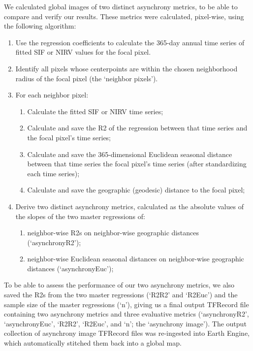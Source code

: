\documentclass[12pt]{article}
\begin{document}
We calculated global images of two distinct asynchrony metrics, to be
able to compare and verify our results. These metrics were calculated,
pixel-wise, using the following algorithm:
\begin{enumerate}
    \item Use the regression coefficients to calculate the 365-day annual time series of fitted SIF or NIRV values for the focal pixel.
    \item Identify all pixels whose centerpoints are within the chosen neighborhood radius of the focal pixel (the ‘neighbor pixels’).
    \item For each neighbor pixel:
    \begin{enumerate}
        \item Calculate the fitted SIF or NIRV time series;
        \item Calculate and save the R2 of the regression between that time series and the focal pixel’s time series;
        \item Calculate and save the 365-dimensional Euclidean seasonal distance between that time series the focal pixel’s time series (after standardizing each time series);
        \item Calculate and save the geographic (geodesic) distance to the focal pixel;
    \end{enumerate}
    \item Derive two distinct asynchrony metrics, calculated as the absolute values of the slopes of the two master regressions of:
        \begin{enumerate}
            \item neighbor-wise R2s on neighbor-wise geographic distances (‘asynchronyR2’);
            \item neighbor-wise Euclidean seasonal distances on neighbor-wise geographic distances (‘asynchronyEuc’);
        \end{enumerate}
\end{enumerate}

To be able to assess the performance of our two asynchrony metrics, we
also saved the R2s from the two master regressions (‘R2R2’ and ‘R2Euc’)
and the sample size of the master regressions (‘n’), giving us a final
output TFRecord file containing two asynchrony metrics and three
evaluative metrics (‘asynchronyR2’, ‘asynchronyEuc’, ‘R2R2’, ‘R2Euc’, and
‘n’; the ‘asynchrony image’). The output collection of asynchrony image
TFRecord files was re-ingested into Earth Engine, which automatically
stitched them back into a global map. 
\end{document}
